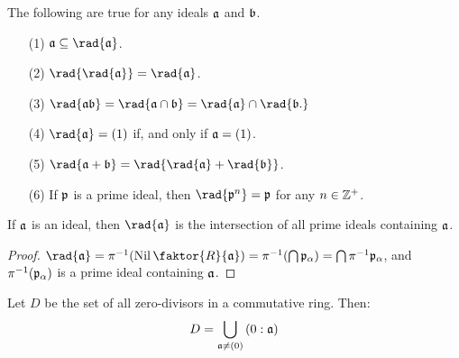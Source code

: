 \begin{proposition}\label{proposition_5.5.14}
  The following are true for any ideals $\af$ and  $\bf$.
  \begin{enumerate}
    \item[(1)] $\af \subseteq \rad{\af}$.

    \item[(2)] $\rad{\rad{\af}}=\rad{\af}$.

    \item[(3)] $\rad{\af\bf}=\rad{\af \cap \bf}=\rad{\af} \cap \rad{\bf.}$

    \item[(4)] $\rad{\af}=(1)$ if, and only if $\af=(1)$.

    \item[(5)] $\rad{\af+\bf}=\rad{\rad{\af}+\rad{\bf}}$.

    \item[(6)] If $\pf$ is a prime ideal, then $\rad{\pf^n}=\pf$ for any $n \in
      \Z^+$.
  \end{enumerate}
\end{proposition}

\begin{proposition}\label{proposition_5.5.15}
  If $\af$ is an ideal, then $\rad{\af}$ is the intersection of all prime
  ideals containing $\af$.
\end{proposition}
\begin{proof}
  $\rad{\af}=\inv{\pi}(\Nil{\faktor{R}{\af}})=\inv{\pi}(\bigcap{\pf_\a})=
  \bigcap{\inv{\pi}\pf_\a}$, and  $\inv{\pi}(\pf_\a)$ is a prime ideal
  containing $\af$.
\end{proof}

\begin{proposition}\label{proposition_5.5.16}
  Let $D$ be the set of all zero-divisors in a commutative ring. Then:
  \begin{equation}
    D=\bigcup_{\af \neq (0)}{(0:\af)}
  \end{equation}
\end{proposition}
